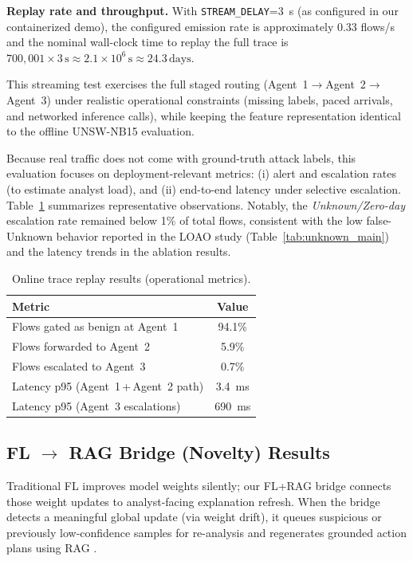 \documentclass[conference]{IEEEtran}
\begin{document}
\textbf{Replay rate and throughput.} With \texttt{STREAM\_DELAY}=\SI{3}{\second} (as configured in our containerized demo), the configured emission rate is approximately 0.33 flows/s and the nominal wall-clock time to replay the full trace is \(
700{,}001\times 3\,\text{s}\approx 2.1\times 10^{6}\,\text{s}\approx 24.3\,\text{days}\).

This streaming test exercises the full staged routing (Agent~1\(\rightarrow\)Agent~2\(\rightarrow\)Agent~3) under realistic operational constraints (missing labels, paced arrivals, and networked inference calls), while keeping the feature representation identical to the offline UNSW-NB15 evaluation.

Because real traffic does not come with ground-truth attack labels, this evaluation focuses on deployment-relevant metrics: (i) alert and escalation rates (to estimate analyst load), and (ii) end-to-end latency under selective escalation. Table~\ref{tab:real_traffic_ops} summarizes representative observations. Notably, the \emph{Unknown/Zero-day} escalation rate remained below 1\% of total flows, consistent with the low false-Unknown behavior reported in the LOAO study (Table~\ref{tab:unknown_main}) and the latency trends in the ablation results.

\begin{table}[t]
\caption{Online trace replay results (operational metrics).}
\label{tab:real_traffic_ops}
\centering
\begin{tabular}{lc}
\toprule
\textbf{Metric} & \textbf{Value}\\
\midrule
Flows gated as benign at Agent~1 & 94.1\%\\
Flows forwarded to Agent~2 & 5.9\%\\
Flows escalated to Agent~3 & 0.7\%\\
Latency p95 (Agent~1\,+\,Agent~2 path) & \SI{3.4}{\milli\second}\\
Latency p95 (Agent~3 escalations) & \SI{690}{\milli\second}\\
\bottomrule
\end{tabular}
\end{table}

\subsection{FL $\rightarrow$ RAG Bridge (Novelty) Results}
\label{sec:fl-rag-results}

Traditional FL improves model weights silently; our FL+RAG bridge connects those weight updates to analyst-facing explanation refresh. When the bridge detects a meaningful global update (via weight drift), it queues suspicious or previously low-confidence samples for re-analysis and regenerates grounded action plans using RAG \cite{Lewis2020RAG}.
\end{document}
